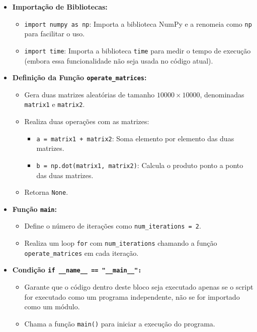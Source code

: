 \documentclass[
	12pt,				%
	openright,			%
	oneside,			%
	a4paper,			%
	chapter=TITLE,		%
	english,			%
	french,				%
	spanish,			%
	brazil				%
	]{abntex2}
\theoremstyle{definition}
\begin{document}
\begin{itemize}[label=--]
    \item \textbf{Importação de Bibliotecas:}
    \begin{itemize}
        \item \texttt{import numpy as np}: Importa a biblioteca NumPy e a renomeia como \texttt{np} para facilitar o uso.
        \item \texttt{import time}: Importa a biblioteca \texttt{time} para medir o tempo de execução (embora essa funcionalidade não seja usada no código atual).
    \end{itemize}
    
    \item \textbf{Definição da Função \texttt{operate\_matrices}:}
    \begin{itemize}
        \item Gera duas matrizes aleatórias de tamanho \(10000 \times 10000\), denominadas \texttt{matrix1} e \texttt{matrix2}.
        \item Realiza duas operações com as matrizes:
        \begin{itemize}
            \item \texttt{a = matrix1 + matrix2}: Soma elemento por elemento das duas matrizes.
            \item \texttt{b = np.dot(matrix1, matrix2)}: Calcula o produto ponto a ponto das duas matrizes.
        \end{itemize}
        \item Retorna \texttt{None}.
    \end{itemize}
    
    \item \textbf{Função \texttt{main}:}
    \begin{itemize}
        \item Define o número de iterações como \texttt{num\_iterations = 2}.
        \item Realiza um loop \texttt{for} com \texttt{num\_iterations} chamando a função \texttt{operate\_matrices} em cada iteração.
    \end{itemize}
    
    \item \textbf{Condição \texttt{if \_\_name\_\_ == "\_\_main\_\_":}}
    \begin{itemize}
        \item Garante que o código dentro deste bloco seja executado apenas se o script for executado como um programa independente, não se for importado como um módulo.
        \item Chama a função \texttt{main()} para iniciar a execução do programa.
    \end{itemize}
\end{itemize}
\end{document}
